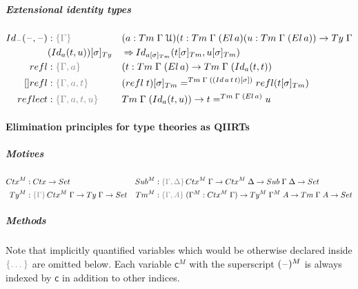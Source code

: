 \documentclass[a4paper,UKenglish,numberwithinsect,cleveref,thm-restate]{lipics-v2021}
\begin{document}
\subparagraph*{Extensional identity types}

\begin{alignat*}{5}
  \idtype[\blank]{\blank}{\blank} & : \implicit{\Gamma} && (a : \Tm\;\Gamma\;\UU) (t : \Tm\;\Gamma\;(\El\,a)(u : \Tm\;\Gamma\;(\El\,a)) \to \Ty\;\Gamma \\
  & \subTy{(\idtype[a]{t}{u})}{\sigma} && \reduce \idtype[{\subTm{a}{\sigma}}]{\subTm{t}{\sigma}}{\subTm{u}{\sigma}} \\
  \mathsf{refl} & : \implicit{\Gamma, a}\;&&(t : \Tm\;\Gamma\;(\El\,a) \to \Tm\;\Gamma\;(\idtype[a]{t}{t}) \\
  []\mathsf{refl} & : \implicit{\Gamma, a, t}\;&& \subTm{(\mathsf{refl}\;t)}{\sigma} =^{\Tm\;\Gamma\;(\sub{(\mathsf{Id}\,a\,t\,t)}{\sigma})} \mathsf{refl}(\subTm{t}{\sigma}) \\
  \mathsf{reflect} & : \implicit{\Gamma, a, t, u}\;&& \Tm\;\Gamma\;(\idtype[a]{t}{u}) \to t =^{\Tm\;\Gamma\;(\El\,a)} u
\end{alignat*}

\paragraph*{Elimination principles for type theories as QIIRTs}

\subparagraph*{Motives}
\begin{align*}
  \Ctx^M & : \Ctx \to \Set &
  \Sub^M & : \implicit{\Gamma, \Delta}\,\Ctx^M\;\Gamma \to \Ctx^M\;\Delta \to \Sub\;\Gamma\;\Delta \to \Set \\
  \Ty^M  & : \implicit{\Gamma}\,\Ctx^M\;\Gamma \to \Ty\;\Gamma \to \Set &
  \Tm^M  & : \implicit{\Gamma, A}\; (\Gamma^M : \Ctx^M\;\Gamma) \to \Ty^M\;\Gamma^M\;A \to \Tm\;\Gamma\;A \to \Set
\end{align*}

\subparagraph*{Methods}
Note that implicitly quantified variables which would be otherwise declared inside $\implicit{\dots}$ are omitted below.
Each variable $\mathsf{c}^M$ with the superscript $(\mathord{\hspace{1pt}\text{--}\hspace{1pt}})^M$ is always indexed by $\mathsf{c}$ in addition to other indices.
\end{document}
